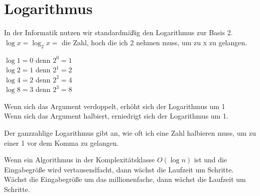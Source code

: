 \documentclass{beamer}
\begin{document}
\section{Logarithmus}
\begin{frame}[fragile]
In der Informatik nutzen wir standardmäßig den Logarithmus zur Basis 2. 
$\log x = \log_{2} x = $ die Zahl, hoch die ich 2 nehmen muss, um zu x zu gelangen. \pause

$\log 1 =  0$ denn $2^0 = 1$  \\ 
$\log 2 = 1$ denn $2^1 = 2$ \\ 
$\log 4 = 2$ denn $2^2 = 4$  \\ 
$\log 8 =  3$ denn $2^3 = 8$  

Wenn sich das Argument verdoppelt, \pause erhöht sich der Logarithmus um 1 \\ 
Wenn sich das Argument halbiert, \pause erniedrigt sich der Logarithmus um 1. 

Der ganzzahlige Logarithmus gibt an, wie oft ich eine Zahl halbieren muss, um zu einer 1 vor dem Komma zu gelangen.

Wenn ein Algorithmus in der Komplexitätsklasse $O(\log n)$ ist und die Eingabegröße wird vertausendfacht,  dann wächst die Laufzeit um  Schritte. \pause Wächst die Eingabegröße um das millionenfache,  dann wächst die Laufzeit um  Schritte.

\end{frame}

\end{document}
